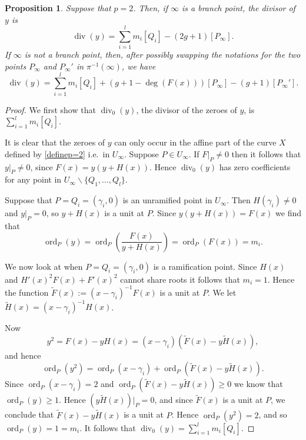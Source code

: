 \documentclass[draft, 11pt]{article} %
\theoremstyle{plain}
\newtheorem{prop}[defn]{Proposition}
\theoremstyle{remark}
\DeclareMathOperator{\ord}{ord}
\DeclareMathOperator{\di}{div}
\begin{document}
\begin{prop}\label{divyp=2}
Suppose that $p=2$.
Then, if $\infty$ is a branch point, the divisor of $y$ is
\begin{equation*}
\di(y) = 
 {\displaystyle \sum_{i=1}^l} m_i[Q_i] -(2g+1)[P_\infty].
\end{equation*}
If $\infty$ is not a branch point, then, after possibly swapping the notations for the two points $P_\infty$ and $P_\infty'$ in $\pi^{-1}(\infty)$, we have
\begin{equation*}
 \di(y) = {\displaystyle \sum_{i=1}^l} m_i[Q_i] +(g+1-\deg(F(x)))[P_\infty] - (g+1)[P_\infty'].
\end{equation*}
\end{prop}
\begin{proof}
We first show that $\di_0(y)$, the divisor of the zeroes of $y$, is $\sum_{i=1}^l m_i [Q_i]$.

It is clear that the zeroes of $y$ can only occur in the affine part of the curve $X$ defined by \eqref{definep=2} i.e.~in $U_\infty$.
Suppose $P\in U_\infty$.
If $\left. F \right|_P \neq 0$ then it follows that $y|_P \neq 0$, since $F(x) = y (y + H(x))$.
Hence $\di_0(y)$ has zero coefficients for any point in $U_\infty\backslash \{Q_1, \ldots, Q_l \}$.

Suppose that $P= Q_i = (\gamma_i, 0)$ is an unramified point in $U_\infty$.
Then $H(\gamma_i) \neq 0$ and $\left. y \right|_P = 0$, so $y + H(x)$ is a unit at $P$.
Since $y(y+H(x)) = F(x)$ we find that
\begin{equation*}
\ord_P(y) = \ord_P\left( \frac{F(x)}{y + H(x)} \right) = \ord_P(F(x)) = m_i.
\end{equation*}

We now look at when $P = Q_i = (\gamma_i, 0)$ is a ramification point.
Since $H(x)$ and $H'(x)^2F(x) + F'(x)^2$ cannot share roots it follows that $m_i = 1$.
Hence the function $\tilde F(x) := (x- \gamma_i)^{-1}F(x)$ is a unit at $P$.
We let $\tilde H(x) = (x- \gamma_i)^{-1}H(x)$.


Now 
\[
y^2 = F(x) - y H(x) = (x- \gamma_i) \left(\tilde F(x) - y \tilde H(x)\right),
\]
and hence
\[
\ord_P(y^2 ) = \ord_P(x-\gamma_i) + \ord_P(\tilde F(x) - y \tilde H(x)).
\]
Since $\ord_P(x-\gamma_i) = 2$ and $\ord_P\left(\tilde F(x) - y \tilde H(x)\right) \geq 0$ we know that $\ord_P(y) \geq 1$.
Hence $(y \tilde H(x)) \big|_P = 0$, and since $\tilde F(x)$ is a unit at $P$, we conclude that $\tilde F(x) - y \tilde H(x)$ is a unit at $P$.
Hence $\ord_P(y^2) = 2$, and so $\ord_P(y) = 1 = m_i$.
It follows that $\di_0(y) =  \sum_{i=1}^l m_i [Q_i]$.


\end{proof}
\end{document}
